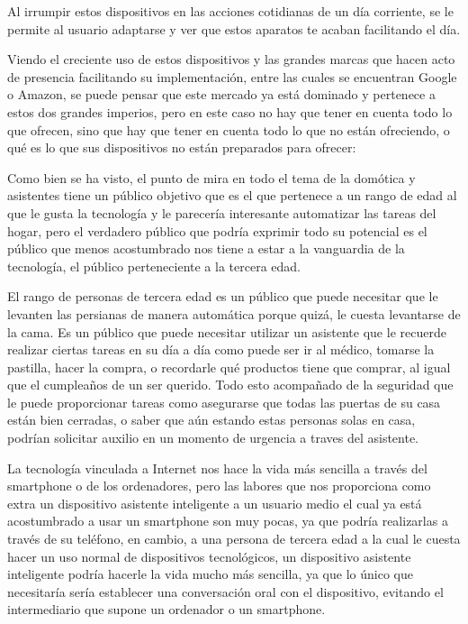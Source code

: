 Al irrumpir estos dispositivos en las acciones cotidianas de un día corriente, se le permite al usuario adaptarse y ver que estos aparatos te acaban facilitando el día.

Viendo el creciente uso de estos dispositivos y las grandes marcas que hacen acto de presencia facilitando su implementación, entre las cuales se encuentran Google o Amazon, se puede pensar que este mercado ya está dominado y pertenece a estos dos grandes imperios, pero en este caso no hay que tener en cuenta todo lo que ofrecen, sino que hay que tener en cuenta todo lo que no están ofreciendo, o qué es lo que sus dispositivos no están preparados para ofrecer:

Como bien se ha visto, el punto de mira en todo el tema de la domótica y asistentes tiene un público objetivo que es el que pertenece a un rango de edad al que le gusta la tecnología y le parecería interesante automatizar las tareas del hogar, pero el verdadero público que podría exprimir todo su potencial es el público que menos acostumbrado nos tiene a estar a la vanguardia de la tecnología, el público perteneciente a la tercera edad.

El rango de personas de tercera edad es un público que puede necesitar que le levanten las persianas de manera automática porque quizá, le cuesta levantarse de la cama. Es un público que puede necesitar utilizar un asistente que le recuerde realizar ciertas tareas en su día a día como puede ser ir al médico, tomarse la pastilla, hacer la compra, o recordarle qué productos tiene que comprar, al igual que el cumpleaños de un ser querido. Todo esto acompañado de la seguridad que le puede proporcionar tareas como asegurarse que todas las puertas de su casa están bien cerradas, o saber que aún estando estas personas solas en casa, podrían solicitar auxilio en un momento de urgencia a traves del asistente.

La tecnología vinculada a Internet nos hace la vida más sencilla a través del smartphone o de los ordenadores, pero las labores que nos proporciona como extra un dispositivo asistente inteligente a un usuario medio el cual ya está acostumbrado a usar un smartphone son muy pocas, ya que podría realizarlas a través de su teléfono, en cambio, a una persona de tercera edad a la cual le cuesta hacer un uso normal de dispositivos tecnológicos, un dispositivo asistente inteligente podría hacerle la vida mucho más sencilla, ya que lo único que necesitaría sería establecer una conversación oral con el dispositivo, evitando el intermediario que supone un ordenador o un smartphone.

